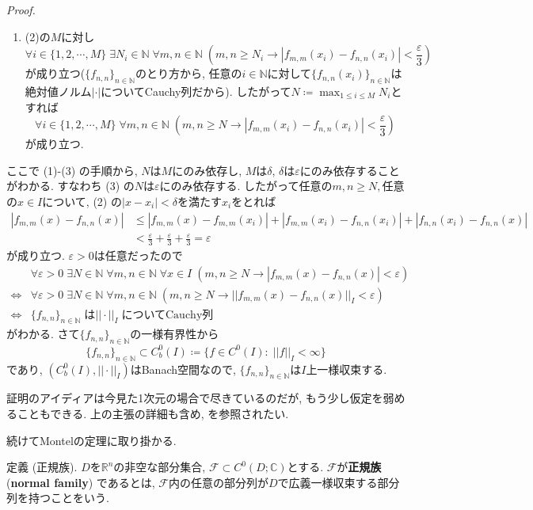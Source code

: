 \documentclass{jsarticle}
\newcommand{\R}{\mathbb{R}}%
\newcommand{\C}{\mathbb{C}}%
\renewenvironment{proof}[1][Proof]{%
\begin{proofbox}%
\textit{#1. }\ignorespaces
}{%
\hfill\qedsymbol%
\end{proofbox}%
}
\begin{document}
\begin{proof}
\begin{enumerate}
\item[(3)] (2)の$M$に対し
\[
\forall i\in\{1, 2, \cdots, M\} \;\exists N_{i}\in\mathbb{N} \;\forall m,n\in\mathbb{N}\; \left(m,n\ge N_i\to|f_{m,m}(x_i)-f_{n,n}(x_i)|<\frac{\varepsilon}{3}\right)
\]
が成り立つ($\{f_{n,n}\}_{n\in\mathbb{N}}$のとり方から, 任意の$i\in\mathbb{N}$に対して$\{f_{n,n}(x_i)\}_{n\in\mathbb{N}}$は絶対値ノルム$|\cdot|$についてCauchy列だから). したがって$N\coloneq \max_{1\le i\le M} N_i$とすれば
\[
\forall i\in\{1, 2, \cdots, M\} \;\forall m,n\in\mathbb{N}\; \left(m,n\ge N\to|f_{m,m}(x_i)-f_{n,n}(x_i)|<\frac{\varepsilon}{3}\right)
\]
が成り立つ.
\end{enumerate}
ここで (1)-(3) の手順から, $N$は$M$にのみ依存し, $M$は$\delta$, $\delta$は$\varepsilon$にのみ依存することがわかる. すなわち (3) の$N$は$\varepsilon$にのみ依存する. したがって任意の$m, n\ge N,$任意の$x\in I$について, (2) の$|x-x_i|<\delta$を満たす$x_i$をとれば
\begin{align*}
|f_{m,m}(x)-f_{n,n}(x)|&\le |f_{m,m}(x)-f_{m,m}(x_i)|+|f_{m,m}(x_i)-f_{n,n}(x_i)|+|f_{n,n}(x_i)-f_{n,n}(x)|\\
                          &< \frac{\varepsilon}{3}+\frac{\varepsilon}{3}+\frac{\varepsilon}{3}=\varepsilon
\end{align*}
が成り立つ. $\varepsilon>0$は任意だったので
\begin{align*}
&\forall \varepsilon>0\; \exists N\in\mathbb{N}\; \forall m, n\in\mathbb{N}\; \forall x\in I\;(m, n\ge N \to |f_{m,m}(x)-f_{n,n}(x)|<\varepsilon) &\\
\iff &\forall \varepsilon>0\; \exists N\in\mathbb{N}\; \forall m, n\in\mathbb{N}\;(m, n\ge N \to ||f_{m,m}(x)-f_{n,n}(x)||_{I}<\varepsilon) &\\
\iff
&\{f_{n,n}\}_{n\in\mathbb{N}}\;\text{は}||\cdot||_{I}\;\text{についてCauchy列} &
\end{align*}
がわかる. さて$\{f_{n,n}\}_{n\in\mathbb{N}}$の一様有界性から
\[
\{f_{n,n}\}_{n\in\mathbb{N}}\subset C^{0}_{b}(I)\coloneq\{f\in C^{0}(I)\colon\;||f||_{I}<\infty\}
\]
であり, 
$(C^{0}_{b}(I),||\cdot||_{I})$はBanach空間なので, $\{f_{n,n}\}_{n\in\mathbb{N}}$は$I$上一様収束する.
\end{proof}
\vspace{1em}
証明のアイディアは今見た1次元の場合で尽きているのだが, もう少し仮定を弱めることもできる. 上の主張の詳細も含め, \cite{Riku}を参照されたい.

続けてMontelの定理に取り掛かる.

\begin{Def}{定義 (正規族).}
$D$を$\R^n$の非空な部分集合, $\mathcal{F}\subset C^{0}(D; \C)$とする. $\mathcal{F}$が\textbf{正規族}(\textbf{normal family}) であるとは, $\mathcal{F}$内の任意の部分列が$D$で広義一様収束する部分列を持つことをいう.
\end{Def}
\end{document}
